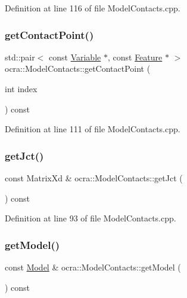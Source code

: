 Definition at line 116 of file Model\+Contacts.\+cpp.

\hypertarget{classocra_1_1ModelContacts_a6fde5f06051fafaebd07a1ebb80bd82c}{}\label{classocra_1_1ModelContacts_a6fde5f06051fafaebd07a1ebb80bd82c} 
\subsubsection{\texorpdfstring{get\+Contact\+Point()}{getContactPoint()}}
{\footnotesize\ttfamily std\+::pair$<$ const \hyperlink{classocra_1_1Variable}{Variable} $\ast$, const \hyperlink{classocra_1_1Feature}{Feature} $\ast$ $>$ ocra\+::\+Model\+Contacts\+::get\+Contact\+Point (\begin{DoxyParamCaption}\item[{int}]{index }\end{DoxyParamCaption}) const}



Definition at line 111 of file Model\+Contacts.\+cpp.

\hypertarget{classocra_1_1ModelContacts_ac3c23337fdfac47ddf40b7e3332e31fc}{}\label{classocra_1_1ModelContacts_ac3c23337fdfac47ddf40b7e3332e31fc} 
\subsubsection{\texorpdfstring{get\+Jct()}{getJct()}}
{\footnotesize\ttfamily const Matrix\+Xd \& ocra\+::\+Model\+Contacts\+::get\+Jct (\begin{DoxyParamCaption}{ }\end{DoxyParamCaption}) const}



Definition at line 93 of file Model\+Contacts.\+cpp.

\hypertarget{classocra_1_1ModelContacts_a188e822de7692fba999836b1ffb7f376}{}\label{classocra_1_1ModelContacts_a188e822de7692fba999836b1ffb7f376} 
\subsubsection{\texorpdfstring{get\+Model()}{getModel()}}
{\footnotesize\ttfamily const \hyperlink{classocra_1_1Model}{Model} \& ocra\+::\+Model\+Contacts\+::get\+Model (\begin{DoxyParamCaption}{ }\end{DoxyParamCaption}) const}



